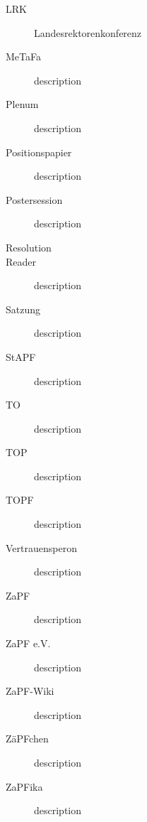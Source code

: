 \begin{description}
	\item[LRK] Landesrektorenkonferenz
	\item[MeTaFa] description
	\item[Plenum] description
	\item[Positionspapier] description
	\item[Postersession] description
	\item[Resolution] 
	\item[Reader] description
	\item[Satzung] description
	\item[StAPF] description
	\item[TO] description
	\item[TOP] description
	\item[TOPF] description
	\item[Vertrauensperon] description
	\item[ZaPF] description
	\item[ZaPF e.V.] description
	\item[ZaPF-Wiki] description
	\item[ZäPFchen] description
	\item[ZaPFika] description
\end{description}